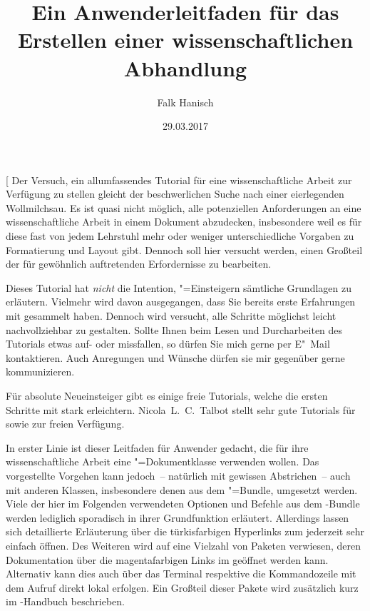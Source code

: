 \documentclass[%
  english,ngerman,%
  cdgeometry=no,DIV=12,automark%
]{tudscrartcl}
\begin{document}
\title{%
  Ein Anwenderleitfaden für das Erstellen einer wissenschaftlichen Abhandlung%
}
\author{Falk Hanisch\TUDScriptContactNote}
\date{29.03.2017}

\makeatletter
\begingroup%
  \def\and{, }%
  \let\thanks\@gobble%
  \let\footnote\@gobble%
\endgroup%
\makeatother

\StartTutorial[%
  Der Versuch, ein allumfassendes Tutorial für eine wissenschaftliche Arbeit 
  zur Verfügung zu stellen gleicht der beschwerlichen Suche nach einer 
  eierlegenden Wollmilchsau. Es ist quasi nicht möglich, alle potenziellen 
  Anforderungen an eine wissenschaftliche Arbeit in einem Dokument abzudecken, 
  insbesondere weil es für diese fast von jedem Lehrstuhl mehr oder weniger 
  unterschiedliche Vorgaben zu Formatierung und Layout gibt. Dennoch soll hier 
  versucht werden, einen Großteil der für gewöhnlich auftretenden Erfordernisse
  zu bearbeiten.
  
  Dieses Tutorial hat \emph{nicht} die Intention, "=Einsteigern 
  sämtliche Grundlagen zu erläutern. Vielmehr wird davon ausgegangen, dass Sie 
  bereits erste Erfahrungen mit  gesammelt haben. Dennoch wird 
  versucht, alle Schritte möglichst leicht nachvollziehbar zu gestalten. Sollte 
  Ihnen beim Lesen und Durcharbeiten des Tutorials etwas auf- oder missfallen, 
  so dürfen Sie mich gerne per E"~Mail kontaktieren. Auch Anregungen und 
  Wünsche dürfen sie mir gegenüber gerne kommunizieren.
  
  Für absolute Neueinsteiger gibt es einige freie Tutorials, welche die ersten 
  Schritte mit  stark erleichtern. Nicola~L.~C.~Talbot stellt 
  sehr gute Tutorials für 
  \cite{talbot2012} sowie 
  \cite{talbot2013} zur freien Verfügung.
  
  In erster Linie ist dieser Leitfaden für Anwender gedacht, die für ihre
  wissenschaftliche Arbeit eine \TUDScript"=Dokumentklasse verwenden wollen. 
  Das vorgestellte Vorgehen kann jedoch~-- natürlich mit gewissen Abstrichen~-- 
  auch mit anderen Klassen, insbesondere denen aus dem \KOMAScript"=Bundle, 
  umgesetzt werden. Viele der hier im Folgenden verwendeten Optionen und
  Befehle aus dem \TUDScript-Bundle werden lediglich sporadisch in ihrer 
  Grundfunktion erläutert. Allerdings lassen sich detaillierte Erläuterung über 
  die türkisfarbigen Hyperlinks zum   
  jederzeit sehr einfach öffnen. Des Weiteren wird auf eine Vielzahl von 
  Paketen verwiesen, deren Dokumentation über die magentafarbigen Links im 
  \CTAN* geöffnet werden kann. Alternativ kann dies auch über das Terminal 
  respektive die Kommandozeile mit dem Aufruf  
  direkt lokal erfolgen. Ein Großteil dieser Pakete wird zusätzlich kurz im 
  \TUDScript-Handbuch beschrieben.
  
\end{document}
